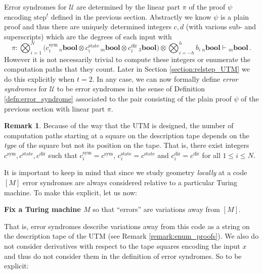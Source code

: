 \documentclass[english,letter paper,12pt,reqno]{article}
\theoremstyle{definition}
\newtheorem{remark}[theorem]{Remark}
\def\be{\begin{equation}}
\def\ee{\end{equation}}
\begin{document}
Error syndromes for $\mathcal{U}$ are determined by the linear part $\pi$ of the proof $\psi$ encoding $\textrm{step}^t$ defined in the previous section. Abstractly we know $\psi$ is a plain proof and thus there are uniquely determined integers $c,d$ (with various sub- and superscripts) which are the degrees of each input with
\be
\pi: \bigotimes_{i = 1}^{N}\Big( c_i^{\text{sym}}\, {}_n\textbf{bool} \otimes c_i^{\text{state}}\, {}_m\textbf{bool} \otimes c_i^{\text{dir}} \, {}_3\textbf{bool} \Big) \otimes \bigotimes_{i=-h}^h b_i \, {}_n\textbf{bool} \vdash {}_m\textbf{bool}\,.
\ee
However it is not necessarily trivial to compute these integers or enumerate the computation paths that they count. Later in Section \ref{section:relstep_UTM} we do this explicitly when $t = 2$. In any case, we can now formally define \emph{error syndromes} for $\mathcal{U}$ to be error syndromes in the sense of Definition \ref{defn:error_syndrome} associated to the pair consisting of the plain proof $\psi$ of the previous section with linear part $\pi$. 

\begin{remark}
Because of the way that the UTM is designed, the number of computation paths starting at a square on the description tape depends on the \emph{type} of the square but not its position on the tape. That is, there exist integers $c^{\text{sym}}, c^{\text{state}}, c^{\text{dir}}$ such that $c_i^{\text{sym}} = c^{\text{sym}}$, $c_i^{\text{state}} = c^{\text{state}}$ and $c_i^{\text{dir}} = c^{\text{dir}}$ for all $1 \le i \le N$.
\end{remark}

It is important to keep in mind that since we study geometry \emph{locally} at a code $[M]$ error syndromes are always considered relative to a particular Turing machine. To make this explicit, let us now:
\begin{center}
    \textbf{Fix a Turing machine $M$} so that ``errors'' are variations away from $[M]$.
\end{center}
That is, error syndromes describe variations away from this code as a string on the description tape of the UTM (see Remark \ref{remark:enum_proofs}). We also do not consider derivatives with respect to the tape squares encoding the input $x$ and thus do not consider them in the definition of error syndromes. So to be explicit:
\end{document}
